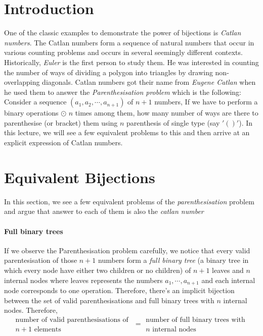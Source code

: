 
\section{Introduction}
One of the classic examples to demonstrate the power of bijections is \emph{Catlan numbers}. The Catlan numbers form a sequence of natural numbers that occur in various counting problems and occurs in several seemingly different contexts. Historically, \emph{Euler} is the first person to study them. He was interested in counting the number of ways of dividing a polygon into triangles by drawing non-overlapping diagonals. Catlan numbers got their name from \emph{Eugene Catlan} when he used them to answer the \emph{Parenthesisation problem} which is the following: Consider a sequence $(a_1,a_2,\cdots,a_{n+1})$ of $n+1$ numbers, If we have to perform a binary operations $\odot$ $n$ times among them, how many number of ways are there to parenthesise (or bracket) them using $n$ parenthesis of single type (say $'()'$). In this lecture, we will see a few equivalent problems to this and then arrive at an explicit expression of Catlan numbers.
\section{Equivalent Bijections}
In this section, we see a few equivalent problems of the \emph{parenthesisation} problem and argue that answer to each of them is also the \emph{catlan number}
\paragraph{Full binary trees} If we observe the Parenthesisation problem carefully, we notice that every valid parentesisation of those $n+1$ numbers form a \emph{full binary tree} (a binary tree in which every node have either two children or no children) of $n+1$ leaves and $n$ internal nodes where leaves represents the numbers $a_1,\cdots,a_{n+1}$ and each internal node corresponds to one operation. Therefore, there's an implicit bijection between the set of valid parenthesisations and full binary trees with $n$ internal nodes. Therefore, 
\begin{equation}
    \substack{\textrm{number of valid parenthesisations of }\\ n+1 \textrm{ elements }}  = \substack{\textrm{number of full binary trees with }\\ n \textrm{ internal nodes}}
\end{equation}  

